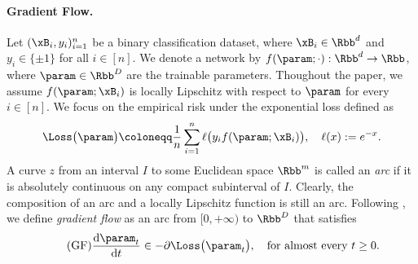 \paragraph{Gradient Flow.} 
Let $(\xB_i, y_i)_{i=1}^n$ be a binary classification dataset, where $\xB_i \in \Rbb^d$ and $y_i \in \{\pm 1\}$ for all $i\in [n]$.  We denote a network by $f(\param; \cdot) : \Rbb^d \to \Rbb$, where $\param \in \Rbb^D$ are the trainable parameters.   
Thoughout the paper, we assume $f(\param;\xB_i)$ is locally Lipschitz with respect to $\param$ for every $i \in [n]$.
We focus on the empirical risk under the exponential loss defined as 
\begin{equation}
\label{eq:loss}
        \Loss \big( \param \big) \coloneqq \frac{1}{n} \sum_{i=1}^n \ell \big( y_i f(\param; \xB_i) \big),\quad  \ell(x) := e^{-x}.
\end{equation}
A curve $z$ from an interval $I$ to some Euclidean space $\Rbb^m$ is called an {\it arc} if it is absolutely continuous on any compact subinterval of $I$. 
Clearly, the composition of an arc and a locally Lipschitz function is still an arc. 
Following \citet{lyu2020gradient,ji2020directional},
we define \emph{gradient flow} as an arc from $[0, + \infty)$ to $\Rbb^D$ that satisfies
\begin{equation}
    \label{eq:GF}
    \tag{GF}
\frac{\mathrm{d} \param_t}{ \mathrm{d} t} \in - \partial \Loss \big( \param_t\big), \quad \text{for almost every}\ t\ge 0. 
\end{equation}


